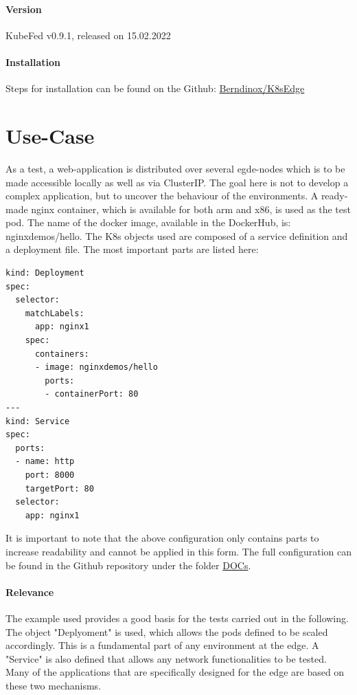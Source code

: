 \documentclass[MSC,Master,english]{twbook}%
\begin{document}
\paragraph{Version} KubeFed v0.9.1, released on 15.02.2022

\paragraph{Installation} Steps for installation can be found on the Github: \hyperref{https://github.com/Berndinox/K8sEdge/blob/main/DOCs/kubefed-install.md}{}{}{Berndinox/K8sEdge} \cite{bk-gh-kf-install}

\section{Use-Case}
\label{sec:dsrusecase}
\label{sec:dsrusecaseweb}
As a test, a web-application is distributed over several egde-nodes which is to be made accessible locally as well as via ClusterIP. The goal here is not to develop a complex application, but to uncover the behaviour of the environments. A ready-made nginx container, which is available for both arm and x86, is used as the test pod. The name of the docker image, available in the DockerHub, is: nginxdemos/hello. The \ac{K8s} objects used are composed of a service definition and a deployment file. The most important parts are listed here:

\vspace{\baselineskip}
\begin{lstlisting}[caption={Web-application code},captionpos=b]
kind: Deployment
spec:
  selector:
    matchLabels:
      app: nginx1
    spec:
      containers:
      - image: nginxdemos/hello
        ports:
        - containerPort: 80
---
kind: Service
spec:
  ports:
  - name: http
    port: 8000
    targetPort: 80
  selector:
    app: nginx1
\end{lstlisting}

It is important to note that the above configuration only contains parts to increase readability and cannot be applied in this form. The full configuration can be found in the Github repository under the folder \hyperref{https://github.com/Berndinox/K8sEdge/blob/main/DOCs/}{}{}{DOCs}\cite{bk-gh-docs}.

\paragraph{Relevance} The example used provides a good basis for the tests carried out in the following. The object "Deplyoment" is used, which allows the pods defined to be scaled accordingly. This is a fundamental part of any environment at the edge. A "Service" is also defined that allows any network functionalities to be tested. Many of the applications that are specifically designed for the edge are based on these two mechanisms.
\end{document}
